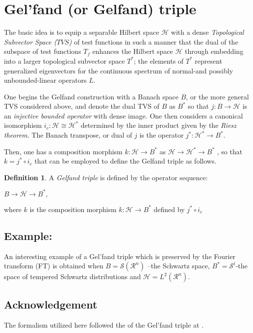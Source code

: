 \documentclass[12pt]{article}
\theoremstyle{plain}
\theoremstyle{definition}
\newtheorem{definition}{Definition}[section]
\renewcommand{\H}{\mathcal H}
\numberwithin{equation}{section}
\newcommand{\R}{\mathcal R}
\newcommand{\cS}{\mathcal S}
\begin{document}
\section{Gel'fand (or Gelfand) triple}

The basic idea is to equip a separable Hilbert space $\H$ with a dense \emph{Topological Subvector Space ($TVS$)} of test functions in such a manner that the dual of the subspace of test functions $T_f$ enhances the Hilbert space $\H$ through embedding into a larger topological subvector space $T^*$; the elements of $T^*$ represent generalized eigenvectors for the continuous spectrum of normal-and possibly unbounded-linear operators $L$.  

One begins the Gelfand construction with a Banach space $B$, or the more general TVS considered above, and denote the dual TVS of $B$ as $B^*$ so that 
$j: B \rightarrow \H$ is an \emph{injective bounded operator} with dense image. One then considers a canonical isomorphism $i_c: \H \cong \H^*$ determined by the inner product given by the {\em Riesz theorem}. The Banach transpose, or dual of $j$ is the operator $j^*: \H^* \to B^*$. 
 

Then, one has a composition morphism $k: \H \rightarrow B^*$ as 
$\H  \to \H^* \to B^*$ , so that  $k = j^* \circ i_c$ that can be employed to define the Gelfand triple as follows.

\begin{definition}
A {\em Gelfand triple} is defined by the operator sequence:

$B \rightarrow \H \rightarrow B^*,$

 where $k$ is the composition morphism $k: \H \to B^*$ defined by $j^* \circ i_c$ 

\end{definition}

\subsection{Example:}
An interesting example of a Gel'fand triple which is preserved by the Fourier transform (FT) is obtained when $B = \cS (\R^n)$ --the Schwartz space, 
$B^* = \cS^t$-the space of tempered Schwartz distributions and 
$\H = L^2(\R^n)$.

\subsection{Acknowledgement}

The formalism utilized here followed the  of the Gel'fand triple at .
\end{document}
